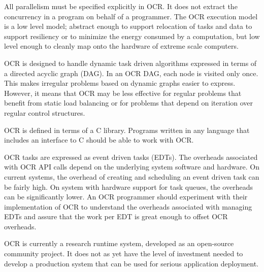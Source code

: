 All parallelism must be specified explicitly in OCR. It does not
extract the concurrency in a program on behalf of a programmer. The
OCR execution model is a low level model; abstract enough to support
relocation of tasks and data to support resiliency or to minimize the
energy consumed by a computation, but low level enough to cleanly map
onto the hardware of extreme scale computers.

OCR is designed to handle dynamic task driven algorithms expressed in
terms of a directed acyclic graph (DAG). In an OCR DAG, each node is
visited only once. This makes irregular problems based on dynamic
graphs easier to express. However, it means that OCR may be less
effective for regular problems that benefit from static load balancing
or for problems that depend on iteration over regular control
structures.
%

OCR is defined in terms of a C library. Programs written in any
language that includes an interface to C should be able to work with
OCR.

OCR tasks are expressed as event driven tasks (EDTs).
The overheads associated with OCR API calls depend on the underlying system software and
hardware.  On current systems, the overhead of
creating and scheduling an event driven task can be fairly high.
On system with hardware support for task queues, the
overheads can be significantly lower.  An OCR programmer should experiment with their
implementation of OCR to understand the overheads associated with managing EDTs and
assure that the work per EDT is great enough to offset OCR overheads.

OCR is currently a research runtime system, developed as an
open-source community project. It does not as yet have the level of
investment needed to develop a production system that can be used for
serious application deployment.
